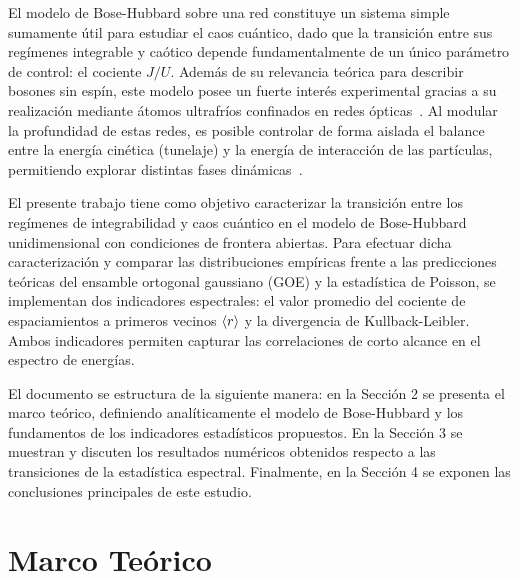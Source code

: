\documentclass[10pt,a4paper]{article}
\begin{document}
El modelo de Bose-Hubbard sobre una red constituye un sistema simple sumamente útil para estudiar el caos cuántico, dado que la transición entre sus regímenes integrable y caótico depende fundamentalmente de un único parámetro de control: el cociente $J/U$. Además de su relevancia teórica para describir bosones sin espín, este modelo posee un fuerte interés experimental gracias a su realización mediante átomos ultrafríos confinados en redes ópticas~\cite{Jaksch1998, greiner2002quantum}. Al modular la profundidad de estas redes, es posible controlar de forma aislada el balance entre la energía cinética (tunelaje) y la energía de interacción de las partículas, permitiendo explorar distintas fases dinámicas~\cite{Jaksch1998, greiner2002quantum}.

El presente trabajo tiene como objetivo caracterizar la transición entre los regímenes de integrabilidad y caos cuántico en el modelo de Bose-Hubbard unidimensional con condiciones de frontera abiertas. Para efectuar dicha caracterización y comparar las distribuciones empíricas frente a las predicciones teóricas del ensamble ortogonal gaussiano (GOE) y la estadística de Poisson, se implementan dos indicadores espectrales: el valor promedio del cociente de espaciamientos a primeros vecinos $\ev{r}$ y la divergencia de Kullback-Leibler. Ambos indicadores permiten capturar las correlaciones de corto alcance en el espectro de energías.

El documento se estructura de la siguiente manera: en la Sección 2 se presenta el marco teórico, definiendo analíticamente el modelo de Bose-Hubbard y los fundamentos de los indicadores estadísticos propuestos. En la Sección 3 se muestran y discuten los resultados numéricos obtenidos respecto a las transiciones de la estadística espectral. Finalmente, en la Sección 4 se exponen las conclusiones principales de este estudio.

\section{Marco Teórico}
\end{document}
